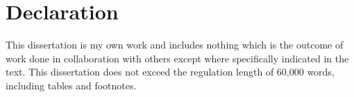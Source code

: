 

\chapter*{Declaration} %

\thispagestyle{empty}

This dissertation is my own work and includes nothing which is the outcome of work done in collaboration
with others except where specifically indicated in the text.
This dissertation does not exceed the regulation length of 60,000 words, including tables and footnotes.